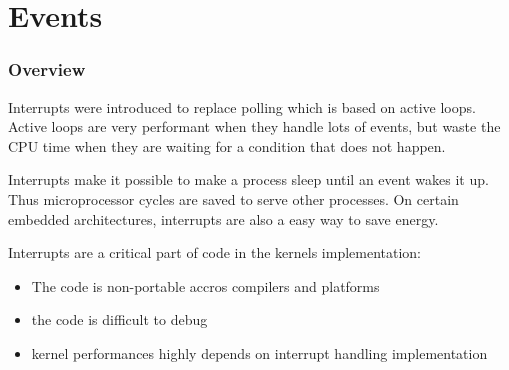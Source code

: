 \section{Events}

%
%
%

\begin{frame}
  \frametitle{Overview}

  Interrupts were introduced to replace polling which is based on active
  loops. Active loops are very performant when they handle lots of events, but
  waste the CPU time when they are waiting for a condition that does not
  happen.

  \-

  Interrupts make it possible to make a process sleep until an event wakes it
  up. Thus microprocessor cycles are saved to serve other processes. On certain
  embedded architectures, interrupts are also a easy way to save energy.

  \-

  Interrupts are a critical part of code in the kernels implementation:

  \begin{itemize}
    \item The code is non-portable accros compilers and platforms
    \item the code is difficult to debug
    \item kernel performances highly depends on interrupt handling implementation
  \end{itemize}

\end{frame}


%
%
%

